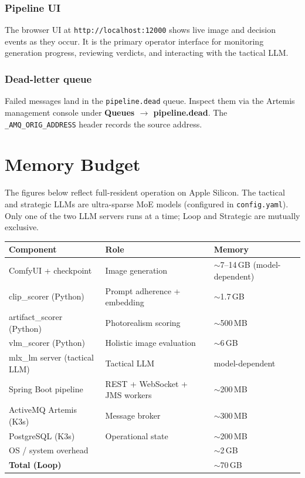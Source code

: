 \documentclass[11pt,letterpaper]{article}
\begin{document}
\subsubsection{Pipeline UI}

The browser UI at \texttt{http://localhost:12000} shows live image and
decision events as they occur. It is the primary operator interface for
monitoring generation progress, reviewing verdicts, and interacting with
the tactical LLM.

\subsubsection{Dead-letter queue}

Failed messages land in the \texttt{pipeline.dead} queue. Inspect them via
the Artemis management console under \textbf{Queues $\to$ pipeline.dead}.
The \texttt{\_AMQ\_ORIG\_ADDRESS} header records the source address.

\section{Memory Budget}
\label{sec:memory}

The figures below reflect full-resident operation on Apple Silicon.
The tactical and strategic LLMs are ultra-sparse MoE models (configured in
\texttt{config.yaml}). Only one of the two LLM servers runs at a time;
Loop and Strategic are mutually exclusive.

\begin{center}
\begin{tabular}{lll}
\toprule
\textbf{Component} & \textbf{Role} & \textbf{Memory} \\
\midrule
ComfyUI + checkpoint     & Image generation                     & $\sim$7--14\,GB (model-dependent) \\
clip\_scorer (Python)    & Prompt adherence + embedding         & $\sim$1.7\,GB \\
artifact\_scorer (Python)& Photorealism scoring                 & $\sim$500\,MB \\
vlm\_scorer (Python)     & Holistic image evaluation            & $\sim$6\,GB \\
mlx\_lm server (tactical LLM)              & Tactical LLM    & model-dependent \\
Spring Boot pipeline     & REST + WebSocket + JMS workers       & $\sim$200\,MB \\
ActiveMQ Artemis (K3s)   & Message broker                       & $\sim$300\,MB \\
PostgreSQL (K3s)         & Operational state                    & $\sim$200\,MB \\
OS / system overhead     &                                      & $\sim$2\,GB \\
\midrule
\textbf{Total (Loop)}    &                                      & $\sim$70\,GB \\
\bottomrule
\end{tabular}
\end{center}
\end{document}
